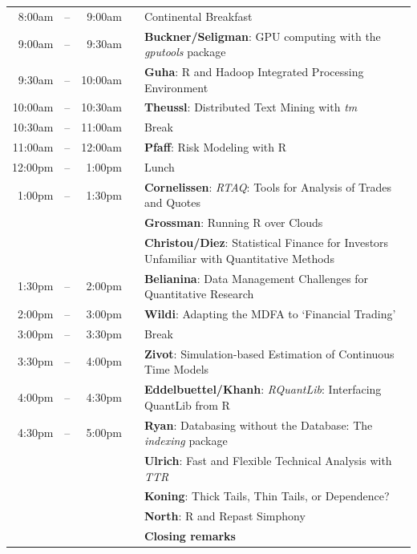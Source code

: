 \documentclass[11pt]{article}
\newcommand{\mylinecolor}[1]{\color{#1}\vspace{-8pt}}  %
\begin{document}
\begin{tabular}{rlrlp{5in}}
  8:00am  & -- &  9:00am &   & \small{\mylinecolor{Breaks} Continental Breakfast}  \\
  9:00am  & -- &  9:30am &   & \textbf{\color{Talk} Buckner/Seligman}: \small{GPU computing with the \emph{gputools} package} \\
  9:30am  & -- & 10:00am &   & \textbf{\color{Talk} Guha}: \small{R and Hadoop Integrated Processing Environment} \\
  10:00am & -- & 10:30am &   & \textbf{\color{Talk} Theussl}: \small{Distributed Text Mining with \emph{tm}} \\
  10:30am & -- & 11:00am &   & \small{\mylinecolor{Breaks}  Break}  \\
  11:00am & -- & 12:00am &   & \textbf{\color{KeynoteTalk} Pfaff}: \small{Risk Modeling with R} \\
  12:00pm & -- &  1:00pm &   & \small{\mylinecolor{Breaks}  Lunch}  \\
   1:00pm & -- &  1:30pm &   & \textbf{\color{LightningTalk} Cornelissen}: \small{\emph{RTAQ}: Tools for Analysis of Trades and Quotes} \\
          &    &         &   & \textbf{\color{LightningTalk} Grossman}: \small{Running R over Clouds} \\
          &    &         &   & \textbf{\color{LightningTalk} Christou/Diez}: \small{Statistical Finance for Investors Unfamiliar with Quantitative Methods} \\
   1:30pm & -- & 2:00pm  &   & \textbf{\color{Talk} Belianina}: \small{Data Management Challenges for Quantitative Research} \\
   2:00pm & -- & 3:00pm  &   & \textbf{\color{KeynoteTalk} Wildi}: \small{Adapting the MDFA to `Financial Trading'} \\
   3:00pm & -- & 3:30pm  &   & \small{\mylinecolor{Breaks} Break} \\
   3:30pm & -- & 4:00pm  &   & \textbf{\color{Talk} Zivot}: \small{Simulation-based Estimation of Continuous Time Models} \\
   4:00pm & -- & 4:30pm  &   & \textbf{\color{Talk} Eddelbuettel/Khanh}: \small{\emph{RQuantLib}: Interfacing QuantLib from R} \\
   4:30pm & -- & 5:00pm  &   & \textbf{\color{LightningTalk} Ryan}: \small{Databasing without the Database: The \emph{indexing} package} \\
          &    &         &   & \textbf{\color{LightningTalk} Ulrich}: \small{Fast and Flexible Technical Analysis with \emph{TTR}} \\
          &    &         &   & \textbf{\color{LightningTalk} Koning}: \small{Thick Tails, Thin Tails, or Dependence?} \\
          &    &         &   & \textbf{\color{LightningTalk} North}: \small{R and Repast Simphony} \\
          &    &         &   & \textbf{\color{Breaks} Closing remarks} \\
\end{tabular}
\end{document}
